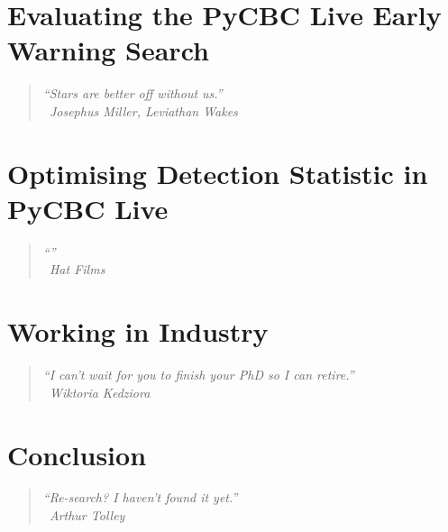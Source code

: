 \documentclass[12pt,twoside]{report} %
\makeatletter
\newcommand{\chapterquote}[2]{
  \begin{quote}
    \color{mediumgray}\itshape #1 \\[1ex] %
    \raggedleft %
    \textemdash\ #2
  \end{quote}
}
\renewcommand{\cleardoublepage}{%
  \clearpage%
  \if@twoside
    \ifodd\c@page
    \else
      \hbox{}%
      \thispagestyle{empty}%
      \newpage
    \fi
  \fi
}
\let\oldchapter\chapter
\renewcommand{\chapter}{\cleardoublepage\oldchapter}
\makeatother
\begin{document}


\chapter[Evaluating the PyCBC Live Early Warning Search]{\label{chapter:6-earlywarning}Evaluating the PyCBC Live Early Warning Search}
\chapterquote{``Stars are better off without us.''}{Josephus Miller, Leviathan Wakes}


\chapter[Optimising Detection Statistic in PyCBC Live]{\label{chaper:7-snr-optimizer}Optimising Detection Statistic in PyCBC Live}
\chapterquote{``''}{Hat Films}


\chapter[Working in Industry]{\label{chapter:8-industry}Working in Industry}
\chapterquote{``I can't wait for you to finish your PhD so I can retire.''}{Wiktoria Kedziora}


\chapter[Conclusion]{\label{chapter:conclusion}Conclusion}
\chapterquote{``Re-search? I haven't found it yet.''}{Arthur Tolley}



% 
% 
\nocite{*}
\printbibliography
\end{document}
